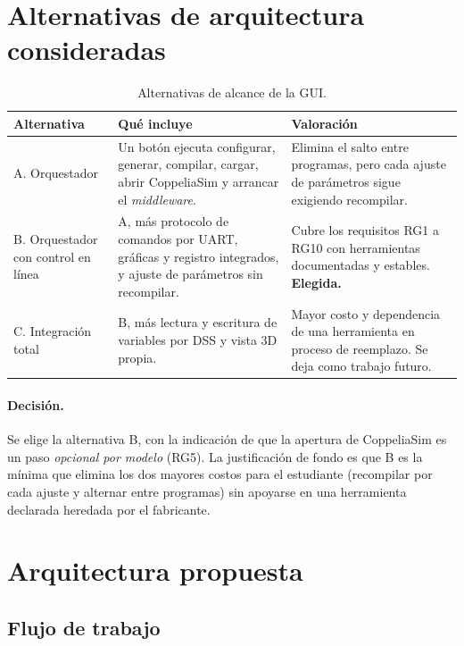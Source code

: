 \documentclass[12pt,letterpaper]{article}
\begin{document}
\section{Alternativas de arquitectura consideradas}
\label{sec:alternativas}

\begin{table}[!htbp]
\centering
\caption{Alternativas de alcance de la GUI.}
\label{tab:alt}
\begin{tabularx}{\textwidth}{>{\raggedright\arraybackslash}p{2.5cm}YY}
\toprule
\textbf{Alternativa} & \textbf{Qué incluye} & \textbf{Valoración} \\
\midrule
A. Orquestador & Un botón ejecuta configurar, generar, compilar, cargar, abrir CoppeliaSim y arrancar el \textit{middleware}. & Elimina el salto entre programas, pero cada ajuste de parámetros sigue exigiendo recompilar. \\
B. Orquestador con control en línea & A, más protocolo de comandos por UART, gráficas y registro integrados, y ajuste de parámetros sin recompilar. & Cubre los requisitos RG1 a RG10 con herramientas documentadas y estables. \textbf{Elegida.} \\
C. Integración total & B, más lectura y escritura de variables por DSS y vista 3D propia. & Mayor costo y dependencia de una herramienta en proceso de reemplazo. Se deja como trabajo futuro. \\
\bottomrule
\end{tabularx}
\end{table}

\paragraph{Decisión.} Se elige la alternativa B, con la indicación de que la apertura de CoppeliaSim es un paso \emph{opcional por modelo} (RG5). La justificación de fondo es que B es la mínima que elimina los dos mayores costos para el estudiante (recompilar por cada ajuste y alternar entre programas) sin apoyarse en una herramienta declarada heredada por el fabricante.

\section{Arquitectura propuesta}
\label{sec:arquitectura}

\subsection{Flujo de trabajo}
\end{document}
